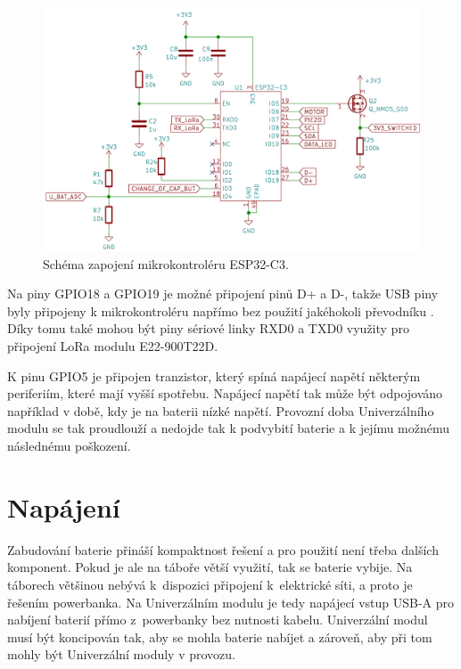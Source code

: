 \begin{figure}[!h]
  \begin{center}
    \includegraphics[scale=0.5]{obrazky/ESP32-C3.png}
  \end{center}
  \caption[Schéma zapojení mikrokontroléru ESP32-C3]{Schéma zapojení mikrokontroléru ESP32-C3.}
\end{figure}

Na piny GPIO18 a GPIO19 je možné připojení pinů D+ a D-, takže USB piny byly připojeny k mikrokontroléru napřímo bez použití jakéhokoli převodníku \cite{ESP_C3_dtsh}. Díky 
tomu také mohou být piny sériové linky RXD0 a TXD0 využity pro připojení LoRa modulu E22-900T22D.

K pinu GPIO5 je připojen tranzistor, který spíná napájecí napětí některým periferiím, které mají vyšší spotřebu. Napájecí napětí tak může být odpojováno například v době,
kdy je na baterii nízké napětí. Provozní doba Univerzálního modulu se tak proudlouží a nedojde tak k podvybití baterie a k jejímu možnému následnému poškození. 

\section{Napájení}
Zabudování baterie přináší kompaktnost řešení a pro použití není třeba dalších komponent. Pokud je ale na táboře větší využití, tak se baterie vybije.
Na táborech většinou nebývá k~dispozici připojení k~elektrické síti, a proto je řešením powerbanka. Na Univerzálním modulu je tedy napájecí vstup USB-A pro nabíjení 
baterií přímo z~powerbanky bez nutnosti kabelu. Univerzální modul musí být koncipován tak, aby se mohla baterie nabíjet a zároveň, aby při tom mohly být Univerzální 
moduly v provozu.

